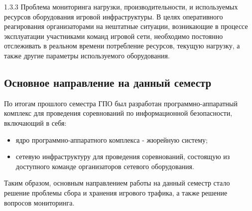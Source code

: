 1.3.3  Проблема мониторинга нагрузки, производительности, и используемых ресурсов оборудования игровой инфраструктуры. В целях оперативного реагирования организаторами на нештатные ситуации, возникающие в процессе эксплуатации участниками команд игровой сети, необходимо постоянно отслеживать в реальном времени потребление ресурсов, текущую нагрузку, а также другие параметры используемого оборудования.\\

\subsection{Основное направление на данный семестр}

По итогам прошлого семестра ГПО был разработан программно-аппаратный комплекс для проведения соревнований по информационной безопасности, включающий в себя:

\begin{itemize}
\item ядро программно-аппаратного комплекса - жюрейную систему;
\item сетевую инфраструктуру для проведения соревнований, состоящую из доступного команде организаторов сетевого оборудования.
\end{itemize}

Таким образом, основным направлением работы на данный семестр стало решение проблемы сбора и хранения игрового трафика, а также решение вопросов мониторинга.\\
\clearpage